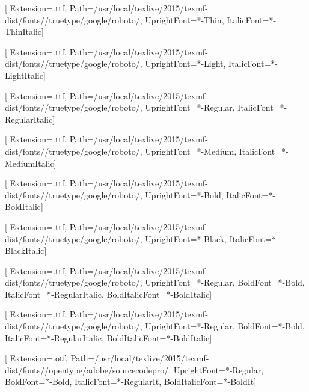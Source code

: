 
\newcommand{\fontdir}[0]{/usr/local/texlive/2015/texmf-dist/fonts/}
\newcommand{\robotodir}[0]{\fontdir/truetype/google/roboto/}
\newcommand{\sourcecodeprodir}[0]{\fontdir/opentype/adobe/sourcecodepro/}

\newfontfamily{}[
  Extension=.ttf,
  Path=\robotodir,
  UprightFont=*-Thin,
  ItalicFont=*-ThinItalic]

\newfontfamily{}[
  Extension=.ttf,
  Path=\robotodir,
  UprightFont=*-Light,
  ItalicFont=*-LightItalic]

\newfontfamily{}[
  Extension=.ttf,
  Path=\robotodir,
  UprightFont=*-Regular,
  ItalicFont=*-RegularItalic]

\newfontfamily{}[
  Extension=.ttf,
  Path=\robotodir,
  UprightFont=*-Medium,
  ItalicFont=*-MediumItalic]

\newfontfamily{}[
  Extension=.ttf,
  Path=\robotodir,
  UprightFont=*-Bold,
  ItalicFont=*-BoldItalic]

\newfontfamily{}[
  Extension=.ttf,
  Path=\robotodir,
  UprightFont=*-Black,
  ItalicFont=*-BlackItalic]

\setmainfont{Roboto}[
  Extension=.ttf,
  Path=\robotodir,
  UprightFont=*-Regular,
  BoldFont=*-Bold,
  ItalicFont=*-RegularItalic,
  BoldItalicFont=*-BoldItalic]

\setsansfont{Roboto}[
  Extension=.ttf,
  Path=\robotodir,
  UprightFont=*-Regular,
  BoldFont=*-Bold,
  ItalicFont=*-RegularItalic,
  BoldItalicFont=*-BoldItalic]

\setmonofont{SourceCodePro}[
  Extension=.otf,
  Path=\sourcecodeprodir,
  UprightFont=*-Regular,
  BoldFont=*-Bold,
  ItalicFont=*-RegularIt,
  BoldItalicFont=*-BoldIt]


